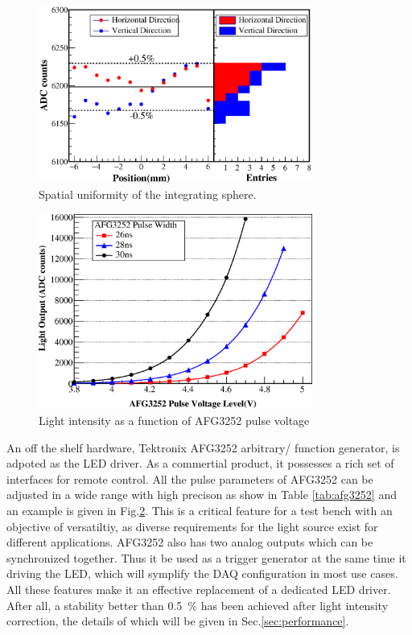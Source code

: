 \documentclass[5p, times]{elsarticle}
\begin{document}
\begin{figure}[h!]
 \centering
 \includegraphics[width=90mm]{uniformity_integratingsphere}
\caption{Spatial uniformity of the integrating sphere.}
\label{fig:uniformity_integratingsphere}
\end{figure} 
  
\begin{figure}[h!]
 \centering
 \includegraphics[width=90mm]{intesityVSvoltage}
\caption{Light intensity as a function of AFG3252 pulse voltage}
\label{fig:afg3252_intensityVSvoltage}
\end{figure} 

An off the shelf hardware, Tektronix AFG3252 arbitrary/ function generator, is adpoted as the LED driver.
As a commertial product, it possesses a rich set of interfaces for remote control.
All the pulse parameters of AFG3252 can be adjusted in a wide range with high precison as show in Table \ref{tab:afg3252} and an example is given in Fig.\ref{fig:afg3252_intensityVSvoltage}.
This is a critical feature for a test bench with an objective of versatiltiy, as diverse requirements for the light source exist for different applications.
AFG3252 also has two analog outputs which can be synchronized together.
Thus it be used as a trigger generator at the same time it driving the LED, which will symplify the DAQ configuration in most use cases. 
All these features make it an effective replacement of a dedicated LED driver. 
After all, a stability better than \SI{0.5}{\percent} has been achieved after light intensity correction, the details of which will be given in Sec.\ref{sec:performance}.
\end{document}
